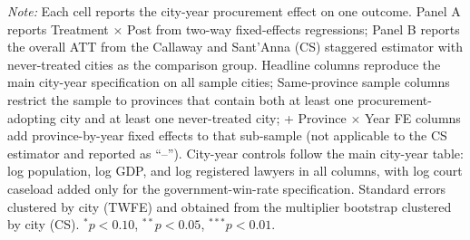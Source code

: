\begin{table}[!htbp]
\begin{threeparttable}
\begin{tablenotes}[flushleft]
\item \textit{Note:} Each cell reports the city-year procurement effect on one outcome. Panel A reports Treatment $\times$ Post from two-way fixed-effects regressions; Panel B reports the overall ATT from the Callaway and Sant'Anna (CS) staggered estimator with never-treated cities as the comparison group. Headline columns reproduce the main city-year specification on all sample cities; Same-province sample columns restrict the sample to provinces that contain both at least one procurement-adopting city and at least one never-treated city; + Province $\times$ Year FE columns add province-by-year fixed effects to that sub-sample (not applicable to the CS estimator and reported as ``--''). City-year controls follow the main city-year table: log population, log GDP, and log registered lawyers in all columns, with log court caseload added only for the government-win-rate specification. Standard errors clustered by city (TWFE) and obtained from the multiplier bootstrap clustered by city (CS). $^{*}p<0.10$, $^{**}p<0.05$, $^{***}p<0.01$.
\end{tablenotes}
\end{threeparttable}
\end{table}
